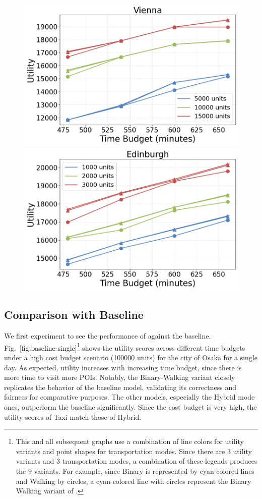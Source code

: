\begin{figure}[t]
    \includegraphics[width=0.65\columnwidth]{plots/exp1-vienna.png}
    \includegraphics[width=0.65\columnwidth]{plots/exp1-edinburgh.png}
    \label{fig:cities}
\end{figure}

\subsection{Comparison with Baseline}

We first experiment to see the performance of \trip against the baseline.
Fig.~\ref{fig:baseline-single}\footnote{This and all subsequent graphs use a combination of line colors for utility variants and point shapes for transportation modes. Since there are 3 utility variants and 3 transportation modes, a combination of these legends produces the 9 \trip variants. For example, since Binary is represented by cyan-colored lines and Walking by circles, a cyan-colored line with circles represent the Binary Walking variant of \trip.}
shows the utility scores across different time budgets under a high cost budget scenario (100000 units) for the city of Osaka for a single day.
As expected, utility increases with increasing time budget, since there is more time to visit more POIs.
Notably, the \trip Binary-Walking variant closely replicates the behavior of the baseline model, validating its correctness and fairness for comparative purposes. The other models, especially the Hybrid mode ones, outperform the baseline significantly.
Since the cost budget is very high, the utility scores of Taxi match those of Hybrid.

